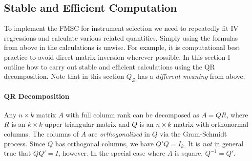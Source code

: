 \documentclass[12pt]{article}
\theoremstyle{definition}
\begin{document}
\subsection{Stable and Efficient Computation}
To implement the FMSC for instrument selection we need to repeatedly fit IV regressions and calculate various related quantities. Simply using the formulas from above in the calculations is unwise. For example, it is computational best practice to avoid direct matrix inversion wherever possible. In this section I outline how to carry out stable and efficient calculations using the QR decomposition. Note that in this section $Q_Z$ has a \emph{different meaning} from above.

\paragraph{QR Decomposition} Any $n\times k$ matrix $A$ with full column rank can be decomposed as $A = QR$, where $R$ is an $k\times k$ upper triangular matrix and $Q$ is an $n\times k$ matrix with orthonormal columns. The columns of $A$ are \emph{orthogonalized} in $Q$ via the Gram-Schmidt process. Since $Q$ has orthogonal columns, we have $Q'Q = I_k$. It is \emph{not} in general true that $QQ' = I$, however. In the special case where $A$ is square, $Q^{-1} = Q'$.
\end{document}
